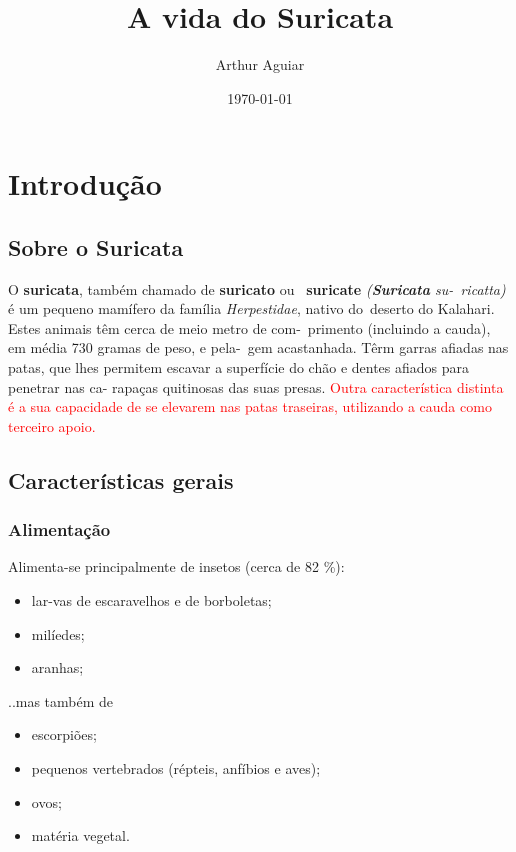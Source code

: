 \documentclass[a4paper,11pt]{report}
\title{A vida do Suricata}
\author{Arthur Aguiar}
\date{\today}
\begin{document}
\maketitle

\chapter{Introdução}

\section{Sobre o Suricata}
	O \textbf{suricata}, também chamado de \textbf{suricato} ou \
	\textbf{suricate} \textit{(\textbf{Suricata} su-\
	ricatta)} é um pequeno mamífero da família \textit{Herpestidae}, nativo do\
	deserto do Kalahari. Estes animais têm cerca de meio metro de com-\
	primento (incluindo a cauda), em média 730 gramas de peso, e pela-\
	gem acastanhada. Têrm garras afiadas nas patas, que lhes permitem
	escavar a superfície do chão e dentes afiados para penetrar nas ca-
	rapaças quitinosas das suas presas. \textcolor{red}{Outra característica distinta é a sua capacidade de se elevarem nas patas traseiras, utilizando a cauda como terceiro apoio.}

\section{Características gerais}
\subsection{Alimentação}
	Alimenta-se principalmente de insetos (cerca de 82 \%):

	\begin{itemize}
		\item lar-vas de escaravelhos e de borboletas;
		\item milíedes;
		\item aranhas;
	\end{itemize}

..mas também de

	\begin{itemize}
		\item escorpiões;
		\item pequenos vertebrados (répteis, anfíbios e aves);
		\item ovos;
		\item matéria vegetal.
	\end{itemize}
\end{document}
